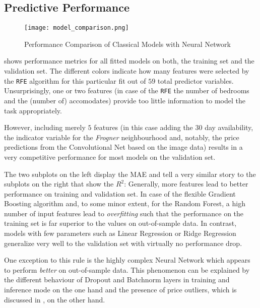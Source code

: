 \subsection{Predictive Performance}

\begin{figure}[t]
  \centering
  \texttt{[image: model\_comparison.png]}
  \caption{Performance Comparison of Classical Models with Neural Network}
  \label{fig:model-comparison}
\end{figure}

 shows performance metrics for all fitted models on both, the training set and the validation set.
The different colors indicate how many features were selected by the \texttt{RFE} algorithm for this particular fit out of $59$ total predictor variables.
Unsurprisingly, one or two features (in case of the \texttt{RFE} the number of bedrooms and the (number of) accomodates) provide too little information to model the task appropriately.

However, including merely $5$ features (in this case adding the $30$ day availability, the indicator variable for the \emph{Frogner} neighbourhood and, notably, the price predictions from the Convolutional Net based on the image data) results in a very competitive performance for most models on the validation set.

The two subplots on the left display the MAE and tell a very similar story to the subplots on the right that show the $R^2$:
Generally, more features lead to better performance on training and validation set.
In case of the flexible Gradient Boosting algorithm and, to some minor extent, for the Random Forest, a high number of input features lead to \emph{overfitting} such that the performance on the training set is far superior to the values on out-of-sample data.
In contrast, models with few parameters such as Linear Regression or Ridge Regression generalize very well to the validation set with virtually no performance drop.

One exception to this rule is the highly complex Neural Network which appears to perform \emph{better} on out-of-sample data.
This phenomenon can be explained by the different behaviour of Dropout and Batchnorm layers in training and inference mode on the one hand and the presence of price outliers, which is discussed in , on the other hand.

